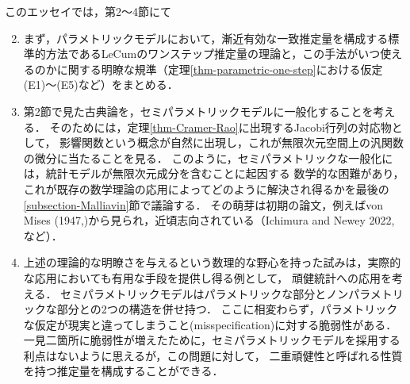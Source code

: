 \documentclass[uplatex, dvipdfmx]{jsarticle}
\begin{document}
このエッセイでは，第2〜4節にて
\begin{enumerate}[{第}1{節}]\setcounter{enumi}{1}
    \item まず，パラメトリックモデルにおいて，漸近有効な一致推定量を構成する標準的方法であるLeCumのワンステップ推定量の理論と，この手法がいつ使えるのかに関する明瞭な規準（定理\ref{thm-parametric-one-step}における仮定(E1)～(E5)など）をまとめる．
    \item 第2節で見た古典論を，セミパラメトリックモデルに一般化することを考える．
    そのためには，定理\ref{thm-Cramer-Rao}に出現するJacobi行列の対応物として，
    影響関数という概念が自然に出現し，これが無限次元空間上の汎関数の微分に当たることを見る．
    このように，セミパラメトリックな一般化には，統計モデルが無限次元成分を含むことに起因する
    数学的な困難があり，これが既存の数学理論の応用によってどのように解決され得るかを最後の\ref{subsection-Malliavin}節で議論する．
    その萌芽は初期の論文，例えばvon Mises (1947,\cite{von Mises})から見られ，近頃志向されている（Ichimura and Newey 2022, \cite{Ichimura and Newey}など）．
    \item 上述の理論的な明瞭さを与えるという数理的な野心を持った試みは，実際的な応用においても有用な手段を提供し得る例として，
    頑健統計への応用を考える．
    セミパラメトリックモデルはパラメトリックな部分とノンパラメトリックな部分との2つの構造を併せ持つ．
    ここに相変わらず，パラメトリックな仮定が現実と違ってしまうこと(misspecification)に対する脆弱性がある．
    一見二箇所に脆弱性が増えたために，セミパラメトリックモデルを採用する利点はないように思えるが，この問題に対して，
    二重頑健性と呼ばれる性質を持つ推定量を構成することができる\cite{Chernozhukov16}．
\end{enumerate}
\end{document}
